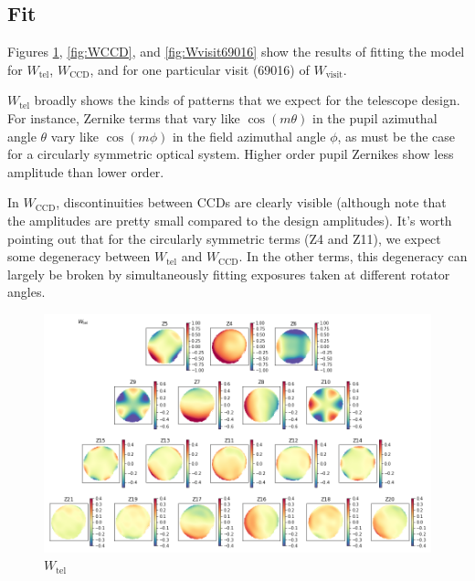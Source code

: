 \documentclass{article}
\begin{document}
\subsection{Fit}

Figures \ref{fig:Wtel}, \ref{fig:WCCD}, and \ref{fig:Wvisit69016} show the
results of fitting the model for $W_\mathrm{tel}$, $W_\mathrm{CCD}$, and for one
particular visit (69016) of $W_\mathrm{visit}$.

$W_\mathrm{tel}$ broadly shows the kinds of patterns that we expect for the
telescope design.  For instance, Zernike terms that vary like $\cos(m \theta)$
in the pupil azimuthal angle $\theta$ vary like $\cos(m \phi)$ in the field
azimuthal angle $\phi$, as must be the case for a circularly symmetric optical
system.  Higher order pupil Zernikes show less amplitude than lower order.

In $W_\mathrm{CCD}$, discontinuities between CCDs are clearly visible (although
note that the amplitudes are pretty small compared to the design amplitudes).
It's worth pointing out that for the circularly symmetric terms (Z4 and Z11),
we expect some degeneracy between $W_\mathrm{tel}$ and $W_\mathrm{CCD}$.  In the
other terms, this degeneracy can largely be broken by simultaneously fitting
exposures taken at different rotator angles.

\begin{figure}
    \includegraphics[width=\textwidth]{Wtel.png}

    \caption{$W_\mathrm{tel}$}

    \label{fig:Wtel}
\end{figure}
\end{document}
